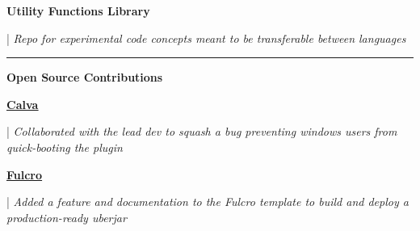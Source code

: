 \documentclass[letterpaper,11pt]{article}
\begin{document}
\begin{minipage}[t]{0.28\textwidth}
  \raggedright
  \textbf{ Utility Functions Library } \\
\end{minipage}
\hfill
\begin{minipage}[t]{0.70\textwidth}
  \raggedright
  |\textit{ Repo for experimental code concepts meant to be transferable between languages } \\
\end{minipage}
\noindent\rule{19.5cm}{0.4pt}

\textbf{\large \textcolor{magic_blue}{Open Source Contributions}}

\begin{minipage}[t]{0.08\textwidth}
  \raggedright
  \href{https://github.com/BetterThanTomorrow/calva/issues/2325}{ \underline{\textbf{Calva}}} \\
\end{minipage}
\hfill
\begin{minipage}[t]{0.90\textwidth}
  \raggedright
  |\textit{ Collaborated with the lead dev to squash a bug preventing windows users from quick-booting the plugin } \\
\end{minipage}

\begin{minipage}[t]{0.08\textwidth}
  \raggedright
  \href{https://github.com/fulcrologic/fulcro-template/pull/28}{ \underline{\textbf{Fulcro}}} \\
\end{minipage}
\hfill
\begin{minipage}[t]{0.90\textwidth}
  \raggedright
  |\textit{ Added a feature and documentation to the Fulcro template to build and deploy a production-ready uberjar } \\
\end{minipage}
\end{document}
